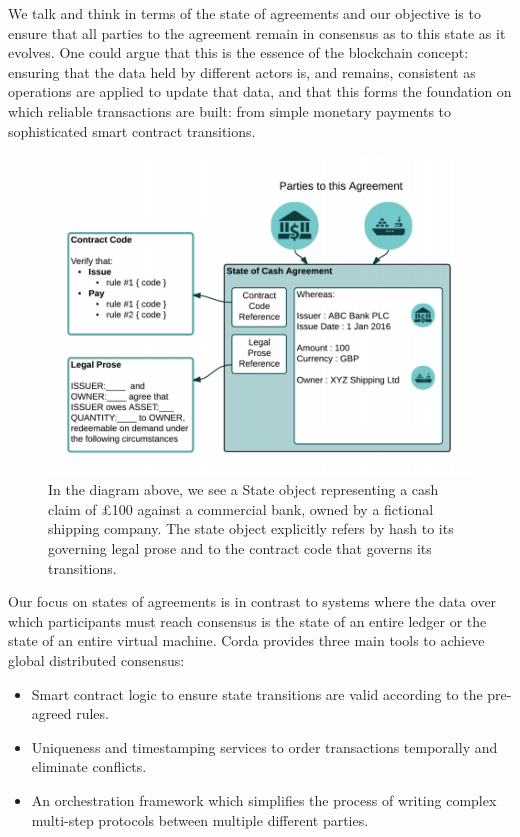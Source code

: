 \documentclass{article}
\begin{document}
We talk and think in terms of the state of agreements and our objective is to ensure that all parties to the agreement remain in consensus as to this state as it evolves. One could argue that this is the essence of the blockchain concept: ensuring that the data held by different actors is, and remains, consistent as operations are applied to update that data, and that this forms the foundation on which reliable transactions are built: from simple monetary payments to sophisticated smart contract transitions.

\begin{figure}[H]
\includegraphics[scale = .4, center]{partiesto}
\caption{In the diagram above, we see a State object representing a cash claim of \pounds100 against a commercial bank, owned by a fictional shipping company.  The state object explicitly refers by hash to its governing legal prose and to the contract code that governs its transitions.}
\end{figure}

Our focus on states of agreements is in contrast to systems where the data over which participants must reach consensus is the state of an entire ledger or the state of an entire virtual machine. Corda provides three main tools to achieve global distributed consensus:
\begin{itemize}
    \item Smart contract logic to ensure state transitions are valid according to the pre-agreed rules.
    \item Uniqueness and timestamping services to order transactions temporally and eliminate conflicts.
    \item An orchestration framework which simplifies the process of writing complex multi-step protocols between multiple different parties.
    \end{itemize}
    
\end{document}
